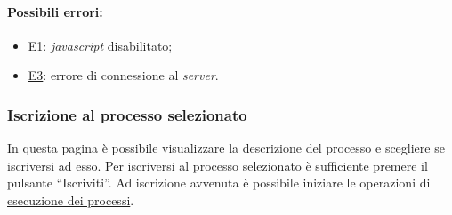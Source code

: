 \paragraph*{Possibili errori:}
\begin{itemize}
\item \hyperref[e1]{E1}: \textit{javascript} disabilitato;
\item \hyperref[e3]{E3}: errore di connessione al \textit{server}.
\end{itemize}

\subsubsection{Iscrizione al processo selezionato}

In questa pagina è possibile visualizzare la descrizione del processo e scegliere se iscriversi ad esso.
Per iscriversi al processo selezionato è sufficiente premere il pulsante ``Iscriviti''.
Ad iscrizione avvenuta è possibile iniziare le operazioni di \hyperref[gestione]{esecuzione dei processi}.

